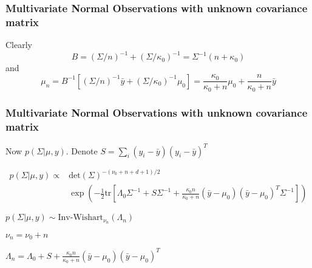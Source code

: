 \documentclass{beamer}
\begin{document}
\begin{frame}[fragile]
\frametitle{Multivariate Normal Observations with unknown covariance matrix}

Clearly 
$$
B = (\Sigma/n)^{-1} + (\Sigma/\kappa_0)^{-1} = \Sigma^{-1}(n + \kappa_0)
$$
and
$$
\mu_n = B^{-1}\left[ (\Sigma/n)^{-1}\bar{y} +  (\Sigma/\kappa_0)^{-1}\mu_0 \right] = \frac{\kappa_0 }{\kappa_0 + n }\mu_0 + \frac{n}{\kappa_0 + n}\bar{y}
$$

\end{frame}


\begin{frame}[fragile]
\frametitle{Multivariate Normal Observations with unknown covariance matrix}

Now $p(\Sigma|\mu, y)$. Denote $S = \sum_i (y_i - \bar{y})(y_i -
  \bar{y})^T$

\begin{align*}
p(\Sigma|\mu, y) \propto &\mbox{det}(\Sigma)^{-(\nu_0 + n + d + 1)/2}
  \\
  &\exp\left(-\frac{1}{2} \text{tr}\left[\Lambda_0 \Sigma^{-1} + S \Sigma^{-1} + \frac{\kappa_0 n}{\kappa_0 + n} (\bar{y} - \mu_0)(\bar{y} - \mu_0)^T \Sigma^{-1}\right] \right)
\end{align*}

$p(\Sigma|\mu, y) \sim \mbox{Inv-Wishart}_{\nu_n}(\Lambda_n)$

$\nu_n = \nu_0 + n$

$\Lambda_n = \Lambda_0  + S + \frac{\kappa_0 n}{\kappa_0 + n} (\bar{y} - \mu_0)(\bar{y} - \mu_0)^T$ 
\end{frame}



\end{document}
